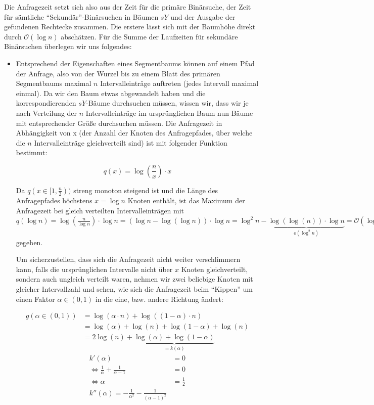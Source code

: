 \documentclass[a4paper]{article}
\begin{document}
Die Anfragezeit setzt sich also aus der Zeit für die primäre Binärsuche, der Zeit für 
sämtliche "`Sekundär"'-Binärsuchen in Bäumen $sY$ und der Ausgabe der gefundenen
Rechtecke zusammen. Die erstere lässt sich mit der 
Baumhöhe direkt durch $\mathcal{O}(\log n)$ abschätzen. Für die Summe der Laufzeiten für 
sekundäre Binärsuchen überlegen wir uns folgendes:

\begin{itemize}
	\item Entsprechend der Eigenschaften eines Segmentbaums können auf einem Pfad der Anfrage,
	also von der Wurzel bis zu einem Blatt des primären Segmentbaums maximal $n$ Intervalleinträge
	auftreten (jedes Intervall maximal einmal). Da wir den Baum etwas abgewandelt haben und 
	die korrespondierenden $sY$-Bäume durchsuchen müssen, wissen wir, dass wir je nach Verteilung
	der $n$ Intervalleinträge im ursprünglichen Baum nun Bäume mit entsprechender Größe durchsuchen müssen. Die Anfragezeit in Abhängigkeit von x (der Anzahl der Knoten des Anfragepfades, über welche die $n$ Intervalleinträge gleichverteilt sind) ist mit folgender Funktion bestimmt:
	
	$$q(x) = \log(\frac{n}{x}) \cdot x$$
	
	Da $q(x \in [1,\frac{n}{2}))$ streng monoton steigend ist und die Länge des Anfragepfades
	höchstens $x = \log n$ Knoten enthält, ist das Maximum der Anfragezeit bei gleich verteilten
	Intervalleinträgen mit $q(\log n) = \log(\frac{n}{\log n}) \cdot \log n = 
	(\log n - \log(\log n)) \cdot \log n = \log^2 n - 
	\underbrace{\log(\log(n)) \cdot \log n}_{o(\log^2 n)} = \mathcal{O}(\log^2 n)$ gegeben.
	
	Um sicherzustellen, dass sich die Anfragezeit nicht weiter verschlimmern kann, falls
	die ursprünglichen Intervalle nicht über $x$ Knoten gleichverteilt, sondern auch ungleich
	verteilt waren, nehmen wir zwei beliebige Knoten mit gleicher Intervallzahl und sehen, 
	wie sich die Anfragezeit beim "`Kippen"' um einen Faktor $\alpha \in (0,1)$ in die eine, bzw. andere Richtung ändert:
	
	\begin{align*}
	g(\alpha \in (0,1)) &= \log (\alpha \cdot n) + \log((1-\alpha) \cdot n) \\
						&= \log (\alpha) + \log(n) + \log (1-\alpha) + \log (n) \\
						&= 2\log (n) + \underbrace{\log(\alpha) + \log (1-\alpha)}_{= k(\alpha)}						
	\end{align*}
	\begin{align*}
	k'(\alpha) &= 0\\
	\Leftrightarrow \frac{1}{\alpha} + \frac{1}{\alpha - 1} &= 0\\	 
	\Leftrightarrow \alpha &= \frac{1}{2}\\
	k''(\alpha) = -\frac{1}{\alpha^2} - \frac{1}{(\alpha-1)^2}
	\end{align*}
	

\end{itemize}
\end{document}
